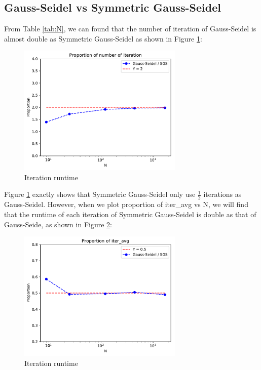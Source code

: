 \documentclass{article}
\begin{document}
\subsection{Gauss-Seidel vs Symmetric Gauss-Seidel}
\label{sec:gauss vs sgs}
From Table \ref{tab:N}, we can found that the number of iteration of Gauss-Seidel is almost double as Symmetric Gauss-Seidel 
as shown in Figure \ref{fig:gauss vs sgs iter}:
\begin{figure}[H]
    \centering
    \includegraphics[width=0.7\textwidth]{src/gauss_sgs_iter.pdf}
    \caption{Iteration runtime}
    \label{fig:gauss vs sgs iter}
\end{figure}
Figure \ref{fig:gauss vs sgs iter} exactly shows that Symmetric Gauss-Seidel only use $\frac{1}{2}$ iterations as Gauss-Seidel.
However, when we plot proportion of iter\_avg vs N, we will find that the runtime of each iteration of Symmetric Gauss-Seidel is
double as that of Gauss-Seide, as shown in Figure \ref{fig:gauss vs sgs avg}:
\begin{figure}[H]
    \centering
    \includegraphics[width=0.7\textwidth]{src/gauss_sgs_avg.pdf}
    \caption{Iteration runtime}
    \label{fig:gauss vs sgs avg}
\end{figure}
\end{document}
